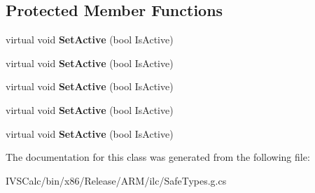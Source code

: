 \subsection*{Protected Member Functions}
\begin{DoxyCompactItemize}
\item 
\mbox{\label{class_windows_1_1_u_i_1_1_xaml_1_1_state_trigger_base_a8d1d92bf5f26e32306af8e8688878379}} 
virtual void {\bfseries Set\+Active} (bool Is\+Active)
\item 
\mbox{\label{class_windows_1_1_u_i_1_1_xaml_1_1_state_trigger_base_a8d1d92bf5f26e32306af8e8688878379}} 
virtual void {\bfseries Set\+Active} (bool Is\+Active)
\item 
\mbox{\label{class_windows_1_1_u_i_1_1_xaml_1_1_state_trigger_base_a8d1d92bf5f26e32306af8e8688878379}} 
virtual void {\bfseries Set\+Active} (bool Is\+Active)
\item 
\mbox{\label{class_windows_1_1_u_i_1_1_xaml_1_1_state_trigger_base_a8d1d92bf5f26e32306af8e8688878379}} 
virtual void {\bfseries Set\+Active} (bool Is\+Active)
\item 
\mbox{\label{class_windows_1_1_u_i_1_1_xaml_1_1_state_trigger_base_a8d1d92bf5f26e32306af8e8688878379}} 
virtual void {\bfseries Set\+Active} (bool Is\+Active)
\end{DoxyCompactItemize}


The documentation for this class was generated from the following file\+:\begin{DoxyCompactItemize}
\item 
I\+V\+S\+Calc/bin/x86/\+Release/\+A\+R\+M/ilc/Safe\+Types.\+g.\+cs\end{DoxyCompactItemize}
